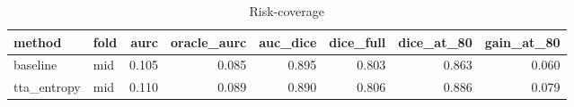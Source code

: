 \begin{table}[t]
\centering
\caption{Risk-coverage}
\label{tab:rc}
\begin{tabular}{llrrrrrr}
\hline
method & fold & aurc & oracle\_aurc & auc\_dice & dice\_full & dice\_at\_80 & gain\_at\_80 \\
\hline
baseline & mid & 0.105 & 0.085 & 0.895 & 0.803 & 0.863 & 0.060 \\
tta\_entropy & mid & 0.110 & 0.089 & 0.890 & 0.806 & 0.886 & 0.079 \\
\hline
\end{tabular}
\end{table}
